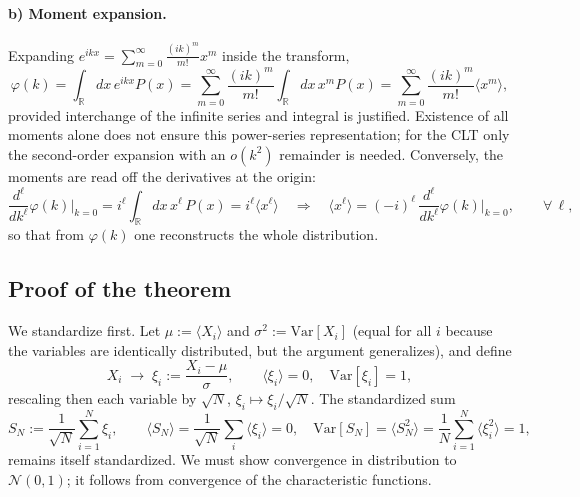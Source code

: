 \paragraph{b) Moment expansion.}
Expanding $e^{ikx}=\sum_{m=0}^{\infty}\frac{(ik)^m}{m!}x^m$ inside the transform,
\begin{equation}
\varphi(k)=\int_{\mathbb{R}} dx\, e^{ikx}P(x) = \sum_{m=0}^{\infty}\frac{(ik)^m}{m!}\int_{\mathbb{R}} dx\, x^m P(x) = \sum_{m=0}^{\infty}\frac{(ik)^m}{m!}\langle x^m\rangle,
\end{equation}
provided interchange of the infinite series and integral is justified.
Existence of all moments alone does not ensure this power-series representation; for the CLT only the second-order expansion with an $o(k^2)$ remainder is needed.
Conversely, the moments are read off the derivatives at the origin:
\begin{equation}
\frac{d^\ell}{dk^\ell}\varphi(k)\Big|_{k=0} = i^\ell\int_{\mathbb{R}} dx\, x^\ell\,P(x) = i^\ell\langle x^\ell\rangle
\quad\Longrightarrow\quad
\langle x^\ell\rangle = (-i)^\ell\,\frac{d^\ell}{dk^\ell}\varphi(k)\Big|_{k=0},
\qquad \forall\,\ell,
\end{equation}
so that from $\varphi(k)$ one reconstructs the whole distribution.

\subsection{Proof of the theorem}

We standardize first.
Let $\mu:=\langle X_i\rangle$ and $\sigma^2:=\mathrm{Var}[X_i]$ (equal for all $i$ because the variables are identically distributed, but the argument generalizes), and define
\begin{equation}
X_i \;\longrightarrow\; \xi_i := \frac{X_i-\mu}{\sigma},
\qquad
\langle\xi_i\rangle = 0, \quad \mathrm{Var}[\xi_i]=1,
\end{equation}
rescaling then each variable by $\sqrt{N}$, $\xi_i\mapsto \xi_i/\sqrt{N}$.
The standardized sum
\begin{equation}
S_N := \frac{1}{\sqrt{N}}\sum_{i=1}^{N}\xi_i,
\qquad
\langle S_N\rangle = \frac{1}{\sqrt{N}}\sum_i \langle\xi_i\rangle = 0,
\quad
\mathrm{Var}[S_N] = \langle S_N^2\rangle = \frac{1}{N}\sum_{i=1}^{N}\langle\xi_i^2\rangle = 1,
\end{equation}
remains itself standardized.
We must show convergence in distribution to $\mathcal N(0,1)$; it follows from convergence of the characteristic functions.

